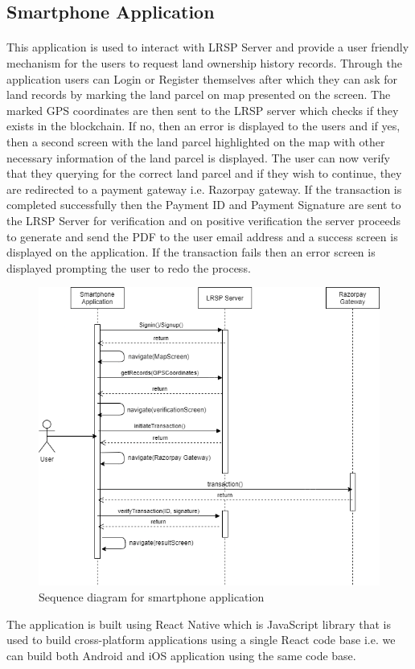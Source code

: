 \documentclass{article}
\begin{document}
    \subsection{Smartphone Application}
        \paragraph{}
        This application is used to interact with LRSP Server and provide a user friendly mechanism for the users to request land ownership history records. Through the application users can Login or Register themselves after which they can ask for land records by marking the land parcel on map presented on the screen. The marked GPS coordinates are then sent to the LRSP server which checks if they exists in the blockchain. If no, then an error is displayed to the users and if yes, then a second screen with the land parcel highlighted on the map with other necessary information of the land parcel is displayed. The user can now verify that they querying for the correct land parcel and if they wish to continue, they are redirected to a payment gateway i.e. Razorpay gateway. If the transaction is completed successfully then the Payment ID and Payment Signature are sent to the LRSP Server for verification and on positive verification the server proceeds to generate and send the PDF to the user email address and a success screen is displayed on the application. If the transaction fails then an error screen is displayed prompting the user to redo the process.
        \begin{figure}[htbp]
            \includegraphics[scale=0.5]{app_sequence}
            \centering
            \caption{Sequence diagram for smartphone application}
        \end{figure}
        The application is built using React Native which is JavaScript library that is used to build cross-platform applications using a single React code base i.e. we can build both Android and iOS application using the same code base. 

    \clearpage
    
    
\end{document}
